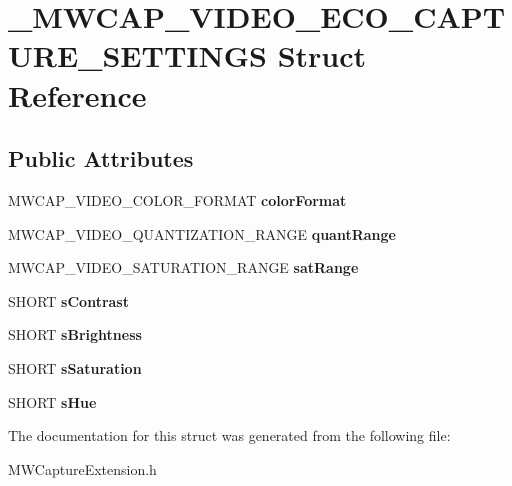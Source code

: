 \hypertarget{struct__MWCAP__VIDEO__ECO__CAPTURE__SETTINGS}{\section{\-\_\-\-M\-W\-C\-A\-P\-\_\-\-V\-I\-D\-E\-O\-\_\-\-E\-C\-O\-\_\-\-C\-A\-P\-T\-U\-R\-E\-\_\-\-S\-E\-T\-T\-I\-N\-G\-S Struct Reference}
\label{struct__MWCAP__VIDEO__ECO__CAPTURE__SETTINGS}
}
\subsection*{Public Attributes}
\begin{DoxyCompactItemize}
\item 
\hypertarget{struct__MWCAP__VIDEO__ECO__CAPTURE__SETTINGS_a3a187004d1296fdeb8d8aa8c2ead1dfa}{M\-W\-C\-A\-P\-\_\-\-V\-I\-D\-E\-O\-\_\-\-C\-O\-L\-O\-R\-\_\-\-F\-O\-R\-M\-A\-T {\bfseries color\-Format}}\label{struct__MWCAP__VIDEO__ECO__CAPTURE__SETTINGS_a3a187004d1296fdeb8d8aa8c2ead1dfa}

\item 
\hypertarget{struct__MWCAP__VIDEO__ECO__CAPTURE__SETTINGS_a13135284ec0061a361942ad1c89759f9}{M\-W\-C\-A\-P\-\_\-\-V\-I\-D\-E\-O\-\_\-\-Q\-U\-A\-N\-T\-I\-Z\-A\-T\-I\-O\-N\-\_\-\-R\-A\-N\-G\-E {\bfseries quant\-Range}}\label{struct__MWCAP__VIDEO__ECO__CAPTURE__SETTINGS_a13135284ec0061a361942ad1c89759f9}

\item 
\hypertarget{struct__MWCAP__VIDEO__ECO__CAPTURE__SETTINGS_a0893277b6bb06767149f29daf481fbe2}{M\-W\-C\-A\-P\-\_\-\-V\-I\-D\-E\-O\-\_\-\-S\-A\-T\-U\-R\-A\-T\-I\-O\-N\-\_\-\-R\-A\-N\-G\-E {\bfseries sat\-Range}}\label{struct__MWCAP__VIDEO__ECO__CAPTURE__SETTINGS_a0893277b6bb06767149f29daf481fbe2}

\item 
\hypertarget{struct__MWCAP__VIDEO__ECO__CAPTURE__SETTINGS_adedb601148c33d133e6a156a423e6c1a}{S\-H\-O\-R\-T {\bfseries s\-Contrast}}\label{struct__MWCAP__VIDEO__ECO__CAPTURE__SETTINGS_adedb601148c33d133e6a156a423e6c1a}

\item 
\hypertarget{struct__MWCAP__VIDEO__ECO__CAPTURE__SETTINGS_a3bef85abe75003878ba075d5e03725ff}{S\-H\-O\-R\-T {\bfseries s\-Brightness}}\label{struct__MWCAP__VIDEO__ECO__CAPTURE__SETTINGS_a3bef85abe75003878ba075d5e03725ff}

\item 
\hypertarget{struct__MWCAP__VIDEO__ECO__CAPTURE__SETTINGS_aadf293cf8e2caa416351a7c90378a5b6}{S\-H\-O\-R\-T {\bfseries s\-Saturation}}\label{struct__MWCAP__VIDEO__ECO__CAPTURE__SETTINGS_aadf293cf8e2caa416351a7c90378a5b6}

\item 
\hypertarget{struct__MWCAP__VIDEO__ECO__CAPTURE__SETTINGS_a19f8e59c0143bfe918f47ea614cd3f96}{S\-H\-O\-R\-T {\bfseries s\-Hue}}\label{struct__MWCAP__VIDEO__ECO__CAPTURE__SETTINGS_a19f8e59c0143bfe918f47ea614cd3f96}

\end{DoxyCompactItemize}


The documentation for this struct was generated from the following file\-:\begin{DoxyCompactItemize}
\item 
M\-W\-Capture\-Extension.\-h\end{DoxyCompactItemize}
